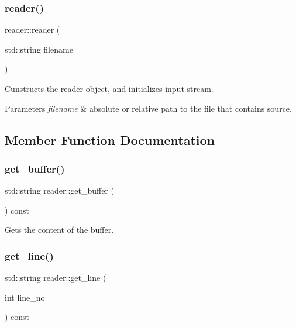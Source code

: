 \subsubsection{\texorpdfstring{reader()}{reader()}\hspace{0.1cm}{\footnotesize\ttfamily [3/3]}}
{\footnotesize\ttfamily reader\+::reader (\begin{DoxyParamCaption}\item[{std\+::string}]{filename }\end{DoxyParamCaption})\hspace{0.3cm}{\ttfamily [private]}}

Cunstructs the reader object, and initializes input stream.


\begin{DoxyParams}{Parameters}
{\em filename} & absolute or relative path to the file that contains source. \\
\hline
\end{DoxyParams}


\subsection{Member Function Documentation}
\mbox{\label{classjawe_1_1reader_ae9da382dd4177088f1d42952d964a49d}} 
\subsubsection{\texorpdfstring{get\+\_\+buffer()}{get\_buffer()}}
{\footnotesize\ttfamily std\+::string reader\+::get\+\_\+buffer (\begin{DoxyParamCaption}{ }\end{DoxyParamCaption}) const}

Gets the content of the buffer. \mbox{\label{classjawe_1_1reader_a03b0b9612dfd5623a425d8943e87dd99}} 
\subsubsection{\texorpdfstring{get\+\_\+line()}{get\_line()}\hspace{0.1cm}{\footnotesize\ttfamily [1/2]}}
{\footnotesize\ttfamily std\+::string reader\+::get\+\_\+line (\begin{DoxyParamCaption}\item[{int}]{line\+\_\+no }\end{DoxyParamCaption}) const}

